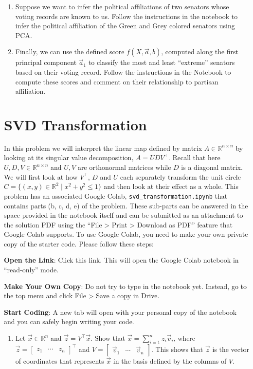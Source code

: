 \documentclass[10pt]{article}
\theoremstyle{definition}
\theoremstyle{plain}
\newcommand{\RR}{\mathbb{R}}
\begin{document}
\begin{enumerate}[label=(\alph*)]
\item Suppose we want to infer the political affiliations of two senators whose voting records are known to us. Follow the instructions in the notebook to infer the political affiliation of the Green and Grey colored senators using PCA.

\item Finally, we can use the defined score $f(X, \vec{a}, b)$, computed along the first principal component $\vec{a}_1$ to classify the most and least ``extreme'' senators based on their voting record. Follow the instructions in the Notebook to compute these scores and comment on their relationship to partisan affiliation.
\end{enumerate}

\section{SVD Transformation}

In this problem we will interpret the linear map defined by matrix $A \in \RR^{n \times n}$ by looking at its singular value decomposition, $A = UDV^\top$. Recall that here $U, D, V \in \RR^{n \times n}$ and $U, V$ are orthonormal matrices while $D$ is a diagonal matrix. We will first look at how $V^\top$, $D$ and $U$ each separately transform the unit circle $C = \{(x,y) \in \RR^2 \mid x^2 + y^2 \leq 1\}$ and then look at their effect as a whole. This problem has an associated Google Colab, \texttt{svd\_transformation.ipynb} that contains parts (b, c, d, e) of the problem. These sub-parts can be answered in the space provided in the notebook itself and can be submitted as an attachment to the solution PDF using the ``File > Print > Download as PDF'' feature that Google Colab supports. To use Google Colab, you need to make your own private copy of the starter code. Please follow these steps:

\textbf{Open the Link}: Click this link. This will open the Google Colab notebook in ``read-only'' mode.

\textbf{Make Your Own Copy}: Do not try to type in the notebook yet. Instead, go to the top menu and click File > Save a copy in Drive.

\textbf{Start Coding}: A new tab will open with your personal copy of the notebook and you can safely begin writing your code.

\begin{enumerate}[label=(\alph*)]
\item Let $\vec{x} \in \RR^n$ and $\vec{z} = V^\top \vec{x}$. Show that $\vec{x} = \sum_{i=1}^n z_i \vec{v}_i$, where $\vec{z} = \begin{bmatrix} z_1 & \cdots & z_n \end{bmatrix}^\top$ and $V = \begin{bmatrix} \vec{v}_1 & \cdots & \vec{v}_n \end{bmatrix}$. This shows that $\vec{z}$ is the vector of coordinates that represents $\vec{x}$ in the basis defined by the columns of $V$.
\end{enumerate}
\end{document}
